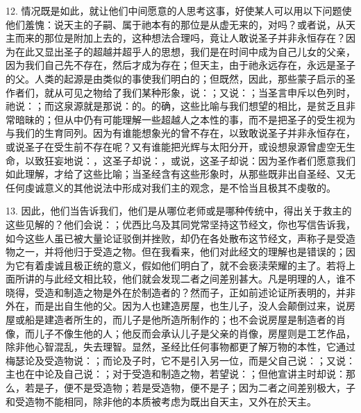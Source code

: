 12. 情况既是如此，就让他们中间愿意的人思考这事，好使某人可以用以下问题使他们羞愧：说天主的子嗣、属于祂本有的那位是从虚无来的，对吗？或者说，从天主而来的那位是附加上去的，这种想法合理吗，竟让人敢说圣子并非永恒存在？因为在此又显出圣子的超越并超乎人的思想，我们是在时间中成为自己儿女的父亲，因为我们自己先不存在，然后才成为存在；但天主，由于祂永远存在，永远是圣子的父。人类的起源是由类似的事使我们明白的；但既然，因此，那些蒙子启示的圣作者们，就从可见之物给了我们某种形象，说：；又说：；当圣言申斥以色列时，祂说：；而这泉源就是那说：的。的确，这些比喻与我们想望的相比，是贫乏且非常暗昧的；但从中仍有可能理解一些超越人之本性的事，而不是把圣子的受生视为与我们的生育同列。因为有谁能想象光的曾不存在，以致敢说圣子并非永恒存在，或说圣子在受生前不存在呢？又有谁能把光辉与太阳分开，或设想泉源曾虚空无生命，以致狂妄地说：，这圣子却说：，或说，这圣子却说：因为圣作者们愿意我们如此理解，才给了这些比喻；当圣经含有这些形象时，从那些既非出自圣经、又无任何虔诚意义的其他说法中形成对我们主的观念，是不恰当且极其不虔敬的。\par

13. 因此，他们当告诉我们，他们是从哪位老师或是哪种传统中，得出关于救主的这些见解的？他们会说：；优西比乌及其同党常坚持这节经文，你也写信告诉我，如今这些人虽已被大量论证驳倒并挫败，却仍在各处散布这节经文，声称子是受造物之一，并将他归于受造之物。但在我看来，他们对此经文的理解也是错误的；因为它有着虔诚且极正统的意义，假如他们明白了，就不会亵渎荣耀的主了。若将上面所讲的与此经文相比较，他们就会发现二者之间差别甚大。凡是明理的人，谁不晓得，受造和制造之物是外在於制造者的？然而子，正如前述论证所表明的，并非外在，而是出自生他的父。因为人也建造房屋，也生儿子，没人会颠倒过来，说房屋或船是建造者所生的，而儿子是他所造所制作的；也不会说房屋是制造者的肖像，而儿子不像生他的人；他反而会承认儿子是父亲的肖像，房屋则是工艺作品，除非他心智混乱，失去理智。显然，圣经比任何事物都更了解万物的本性，它通过梅瑟论及受造物说：；而论及子时，它不是引入另一位，而是父自己说：；又说：主也在中论及自己说：；对于受造和制造之物，若望说：；但他宣讲主时却说：那么，若是子，便不是受造物；若是受造物，便不是子；因为二者之间差别极大，子和受造物不能相同，除非他的本质被考虑为既出自天主，又外在於天主。\par

